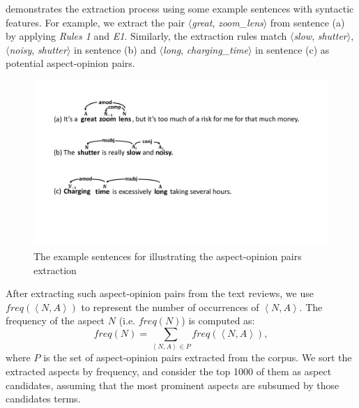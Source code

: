  demonstrates the extraction process using
some example sentences with syntactic features. 
For example, we extract the pair $\langle$\emph{great}, \emph{zoom\_lens}$\rangle$ from sentence (a) 
by applying \emph{Rules 1} and \emph{E1}.
Similarly, the extraction rules match
$\langle$\emph{slow}, \emph{shutter}$\rangle$, $\langle$\emph{noisy}, \emph{shutter}$\rangle$
in sentence (b) and $\langle$\emph{long}, \emph{charging\_time}$\rangle$ in sentence (c) as potential aspect-opinion pairs.
\begin{figure}[th!]
	\centering
	\includegraphics[width=\columnwidth]{figures/extraction}
	\caption{The example sentences for illustrating the aspect-opinion pairs extraction }
	\label{fig:extraction}
\end{figure}

After extracting such aspect-opinion pairs from the text reviews, we use $freq(\left\langle N, A\right\rangle)$ to represent the number
of occurrences of $\left\langle N, A \right\rangle$.
The frequency of the aspect $N$ 
(i.e. $freq(N)$) is computed as: 
\begin{equation}
	freq(N) = \sum\limits_{\left\langle N,A\right\rangle \in P}{freq(\left\langle N, A\right\rangle )},
\end{equation}
where $P$ is the set of aspect-opinion pairs extracted
from the corpus.
We sort the extracted aspects by frequency,
and consider the top 1000 of them
as aspect candidates, assuming that
the most prominent aspects are subsumed by those candidates terms. 


